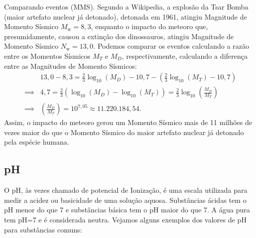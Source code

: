 \begin{example}{Comparando eventos (MMS).}
Segundo a Wikipedia, a explosão da Tsar Bomba (maior artefato nuclear já detonado), detonada em 1961, atingiu Magnitude de Momento Sísmico $M_{\mathrm w} = 8{,}3$, enquanto o impacto do meteoro que, presumidamente, causou a extinção dos dinossauros, atingiu Magnitude de Momento Sísmico $N_{\mathrm w} = 13{,}0$. Podemos comparar os eventos calculando a razão entre os Momentos Sísmicos $M_T$ e $M_D$, respectivamente, calculando a diferença entre as Magnitudes de Momento Sísmicos:
\begin{align*}
&13{,}0-8{,}3 = {\frac{2}{3}}\log_{10}\left(M_{D}\right)-10,7-\left( {\frac{2}{3}}\log_{10}\left(M_{T}\right)-10,7\right)\\
\implies & 4{,}7 = {\frac{2}{3}}\left(\log_{10}\left(M_{D}\right)-\log_{10}\left(M_{T}\right)\right) =  {\frac{2}{3}}\log_{10}\left(\frac{M_D}{M_T}\right)\\
\implies & \left(\frac{M_D}{M_T}\right) = 10^{7{,}05} \approx 11.220.184{,}54.
\end{align*} 
Assim, o impacto do meteoro gerou um Momento Sísmico mais de 11 milhões de vezes maior do que o Momento Sísmico do maior artefato nuclear já detonado pela espécie humana. 
\end{example}

\subsection{pH}\label{EscalaPH}

O pH, às vezes chamado de potencial de Ionização, é uma escala utilizada para medir a acidez ou basicidade de uma solução aquosa. Substâncias ácidas tem o pH menor do que 7 e substâncias básica tem o pH maior do que 7. A água pura tem pH=7 e é considerada neutra. Vejamos alguns exemplos dos valores de pH  para substâncias comuns:


